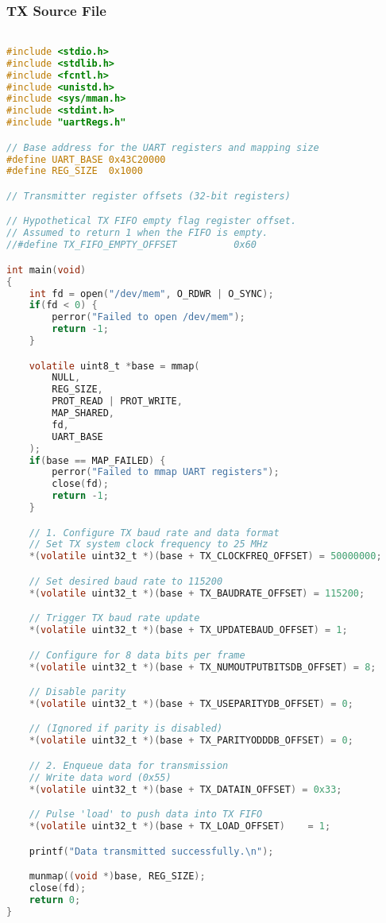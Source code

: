 \subsubsection{TX Source File}
\begin{lstlisting}[language=C,frame=single,label={lst:tx-source}]

#include <stdio.h>
#include <stdlib.h>
#include <fcntl.h>
#include <unistd.h>
#include <sys/mman.h>
#include <stdint.h>
#include "uartRegs.h"

// Base address for the UART registers and mapping size
#define UART_BASE 0x43C20000
#define REG_SIZE  0x1000

// Transmitter register offsets (32-bit registers)

// Hypothetical TX FIFO empty flag register offset.
// Assumed to return 1 when the FIFO is empty.
//#define TX_FIFO_EMPTY_OFFSET          0x60

int main(void)
{
    int fd = open("/dev/mem", O_RDWR | O_SYNC);
    if(fd < 0) {
        perror("Failed to open /dev/mem");
        return -1;
    }

    volatile uint8_t *base = mmap(
        NULL,
        REG_SIZE,
        PROT_READ | PROT_WRITE,
        MAP_SHARED,
        fd,
        UART_BASE
    );
    if(base == MAP_FAILED) {
        perror("Failed to mmap UART registers");
        close(fd);
        return -1;
    }

    // 1. Configure TX baud rate and data format
    // Set TX system clock frequency to 25 MHz
    *(volatile uint32_t *)(base + TX_CLOCKFREQ_OFFSET) = 50000000;

    // Set desired baud rate to 115200
    *(volatile uint32_t *)(base + TX_BAUDRATE_OFFSET) = 115200;

    // Trigger TX baud rate update
    *(volatile uint32_t *)(base + TX_UPDATEBAUD_OFFSET) = 1;

    // Configure for 8 data bits per frame
    *(volatile uint32_t *)(base + TX_NUMOUTPUTBITSDB_OFFSET) = 8;

    // Disable parity
    *(volatile uint32_t *)(base + TX_USEPARITYDB_OFFSET) = 0;

    // (Ignored if parity is disabled)
    *(volatile uint32_t *)(base + TX_PARITYODDDB_OFFSET) = 0;

    // 2. Enqueue data for transmission
    // Write data word (0x55)
    *(volatile uint32_t *)(base + TX_DATAIN_OFFSET) = 0x33;

    // Pulse 'load' to push data into TX FIFO
    *(volatile uint32_t *)(base + TX_LOAD_OFFSET)    = 1;

    printf("Data transmitted successfully.\n");

    munmap((void *)base, REG_SIZE);
    close(fd);
    return 0;
}
\end{lstlisting}

